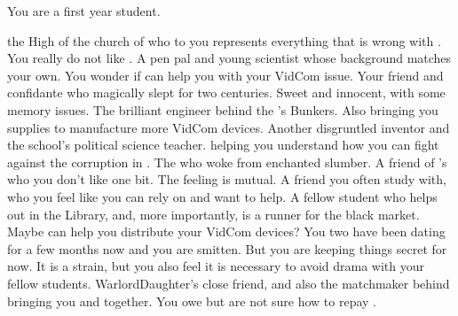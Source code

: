 \documentclass[char]{GL2020}
\begin{document}
\begin{itemz}[Notes]
    \item You are a first year student.
\end{itemz}

\begin{contacts}
    \contact{\cAntiChup{}} the High \cAntiChup{\Cleric} of the church of \cTechGod{} who to you represents everything that is wrong with \pTech{}.  You really do not like \cAntiChup{\them}. 
    \contact {\cAssistantScientist{}} A pen pal and young scientist whose background matches your own. You wonder if \cAssistantScientist{\they} can help you with your VidCom issue.
    \contact{\cDisney{}} Your friend and confidante who magically slept for two centuries. Sweet and innocent, with some memory issues.
    \contact{\cBunker{}} The brilliant engineer behind the \pSc{}'s Bunkers. Also bringing you supplies to manufacture more VidCom devices.
    \contact{\cChupInventor{}} Another disgruntled inventor and the school’s political science teacher.  \cChupInventor{\Theyare} helping you understand how you can fight against the corruption in \pEarth{}.
    \contact{\cWildCard{}} The \cWildCard{\person} who woke \cDisney{} from \cDisney{\their} enchanted slumber. 
    \contact{\cPirateChild{}} A friend of \cDisney{}'s who you don't like one bit. The feeling is mutual.
    \contact{\cScholarship{}} A friend you often study with, who you feel like you can rely on and want to help.
    \contact{\cLibAssist{}} A fellow student who helps out in the Library, and, more importantly, is a runner for the black market. Maybe \cLibAssist{\they} can help you distribute your VidCom devices?
    \contact{\cWarlordDaughter{}} You two have been dating for a few months now and you are smitten. But you are keeping things secret for now. It is a strain, but you also feel it is necessary to avoid drama with your fellow students.
    \contact {\cInitiate{}} WarlordDaughter{}’s close friend, and also the matchmaker behind bringing you and \cWarlordDaughter{} together. You owe \cInitiate{} but are not sure how to repay \cInitiate{\them}. 
\end{contacts}
\end{document}
